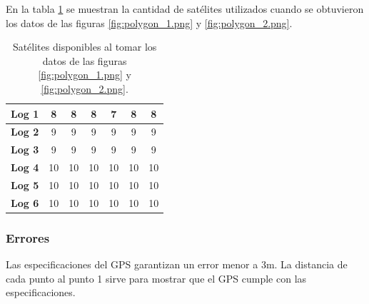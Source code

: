 \documentclass[spanish,12pt,a4paper,titlepage]{report}
\begin{document}


\newpage
En la tabla \ref{tab:polygon-sat} se muestran la cantidad de satélites utilizados cuando se obtuvieron los datos de las figuras \ref{fig:polygon_1.png} y \ref{fig:polygon_2.png}.

\begin{table}[H]
\begin{center}
\begin{tabular}{|l||c|c|c|c|c|c|}
\hline
\textbf{Log 1} & 8 & 8 & 8 & 7 & 8 & 8 \\
\hline
\textbf{Log 2} & 9 & 9 & 9 & 9 & 9 & 9 \\
\hline
\textbf{Log 3} & 9 & 9 & 9 & 9 & 9 & 9 \\
\hline
\textbf{Log 4} & 10 & 10 & 10 & 10 & 10 & 10 \\
\hline
\textbf{Log 5} & 10 & 10 & 10 & 10 & 10 & 10 \\
\hline
\textbf{Log 6} & 10 & 10 & 10 & 10 & 10 & 10\\
\hline
\end{tabular} 
\caption{Satélites disponibles al tomar los datos de las figuras \ref{fig:polygon_1.png} y \ref{fig:polygon_2.png}.}
\label{tab:polygon-sat}
\end{center}
\end{table}

\subsubsection*{Errores}
\label{sec:errores}

Las especificaciones del GPS garantizan un error menor a 3m. La distancia de cada punto al punto 1 sirve para mostrar que el GPS cumple con las especificaciones. 
\end{document}
